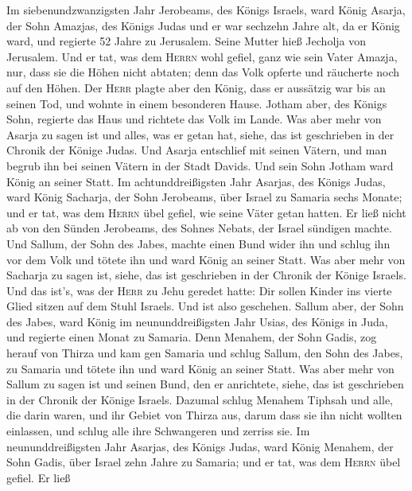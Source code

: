  Im siebenundzwanzigsten Jahr Jerobeams, des Königs
Israels, ward König Asarja, der Sohn Amazjas, des Königs Judas
 und er war sechzehn Jahre alt, da er König ward, und
regierte 52 Jahre zu Jerusalem. Seine Mutter hieß Jecholja von
Jerusalem.  Und er tat, was dem \textsc{Herrn} wohl
gefiel, ganz wie sein Vater Amazja,  nur, dass sie die
Höhen nicht abtaten; denn das Volk opferte und räucherte noch auf den
Höhen.  Der \textsc{Herr} plagte aber den König, dass er
aussätzig war bis an seinen Tod, und wohnte in einem besonderen Hause.
Jotham aber, des Königs Sohn, regierte das Haus und richtete das Volk im
Lande.  Was aber mehr von Asarja zu sagen ist und alles,
was er getan hat, siehe, das ist geschrieben in der Chronik der Könige
Judas.  Und Asarja entschlief mit seinen Vätern, und man
begrub ihn bei seinen Vätern in der Stadt Davids. Und sein Sohn Jotham
ward König an seiner Statt.  Im achtunddreißigsten Jahr
Asarjas, des Königs Judas, ward König Sacharja, der Sohn Jerobeams, über
Israel zu Samaria sechs Monate;  und er tat, was dem
\textsc{Herrn} übel gefiel, wie seine Väter getan hatten. Er ließ nicht
ab von den Sünden Jerobeams, des Sohnes Nebats, der Israel sündigen
machte.  Und Sallum, der Sohn des Jabes, machte einen
Bund wider ihn und schlug ihn vor dem Volk und tötete ihn und ward König
an seiner Statt.  Was aber mehr von Sacharja zu sagen
ist, siehe, das ist geschrieben in der Chronik der Könige Israels.
 Und das ist's, was der \textsc{Herr} zu Jehu geredet
hatte: Dir sollen Kinder ins vierte Glied sitzen auf dem Stuhl Israels.
Und ist also geschehen.  Sallum aber, der Sohn des Jabes,
ward König im neununddreißigsten Jahr Usias, des Königs in Juda, und
regierte einen Monat zu Samaria.  Denn Menahem, der Sohn
Gadis, zog herauf von Thirza und kam gen Samaria und schlug Sallum, den
Sohn des Jabes, zu Samaria und tötete ihn und ward König an seiner
Statt.  Was aber mehr von Sallum zu sagen ist und seinen
Bund, den er anrichtete, siehe, das ist geschrieben in der Chronik der
Könige Israels.  Dazumal schlug Menahem Tiphsah und alle,
die darin waren, und ihr Gebiet von Thirza aus, darum dass sie ihn nicht
wollten einlassen, und schlug alle ihre Schwangeren und zerriss sie.
 Im neununddreißigsten Jahr Asarjas, des Königs Judas,
ward König Menahem, der Sohn Gadis, über Israel zehn Jahre zu Samaria;
 und er tat, was dem \textsc{Herrn} übel gefiel. Er ließ
